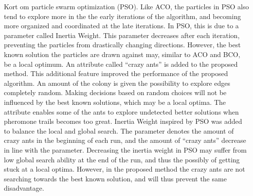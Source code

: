 Kort om particle swarm optimization (PSO). Like ACO, the particles in PSO also tend to explore more in the the early iterations of the algorithm, and becoming more organized and coordinated at the late iterations. In PSO, this is due to a parameter called  Inertia Weight. This parameter decreases after each iteration, preventing the particles from drastically changing directions. However, the best known solution the particles are drawn against may, similar to ACO and BCO, be a local optimum. An attribute called ``crazy ants'' is added to the proposed method. This additional feature improved the performance of the proposed algorithm. An amount of the colony is given the possibility to explore edges completely random. Making decisions based on random choices will not be influenced by the best known solutions, which may be a local optima. The attribute enables some of the ants to explore undetected better solutions when pheromone trails becomes too great. Inertia Weight inspired by PSO was added to balance the local and global search. The parameter denotes the amount of crazy ants in the beginning of each run, and the amount of ``crazy ants'' decrease in line with the parameter. Decreasing the inertia weight in PSO may suffer from low global search ability at the end of the run, and thus the possibly of getting stuck at a local optima. However, in the proposed method the crazy ants are not searching towards the best known solution, and will thus prevent the same disadvantage.


